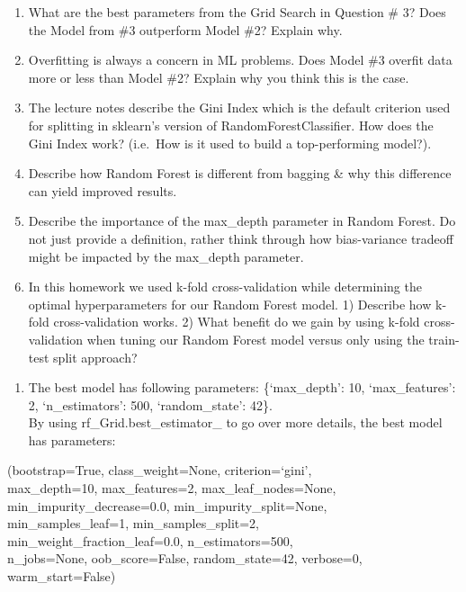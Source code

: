 \documentclass[11pt]{article}
\providecommand{\tightlist}{%
      \setlength{\itemsep}{0pt}\setlength{\parskip}{0pt}}
\begin{document}
    \begin{enumerate}
\def\labelenumi{\alph{enumi})}
\item
  What are the best parameters from the Grid Search in Question \# 3?
  Does the Model from \#3 outperform Model \#2? Explain why.
\item
  Overfitting is always a concern in ML problems. Does Model \#3 overfit
  data more or less than Model \#2? Explain why you think this is the
  case.
\item
  The lecture notes describe the Gini Index which is the default
  criterion used for splitting in sklearn's version of
  RandomForestClassifier. How does the Gini Index work? (i.e.~How is it
  used to build a top-performing model?).
\item
  Describe how Random Forest is different from bagging \& why this
  difference can yield improved results.
\item
  Describe the importance of the max\_depth parameter in Random Forest.
  Do not just provide a definition, rather think through how
  bias-variance tradeoff might be impacted by the max\_depth parameter.
\item
  In this homework we used k-fold cross-validation while determining the
  optimal hyperparameters for our Random Forest model. 1) Describe how
  k-fold cross-validation works. 2) What benefit do we gain by using
  k-fold cross-validation when tuning our Random Forest model versus
  only using the train-test split approach?
\end{enumerate}

    \begin{enumerate}
\def\labelenumi{\alph{enumi})}
\tightlist
\item
  The best model has following parameters: \{`max\_depth': 10,
  `max\_features': 2, `n\_estimators': 500, `random\_state': 42\}.\\
  By using rf\_Grid.best\_estimator\_ to go over more details, the best
  model has parameters:
\end{enumerate}

(bootstrap=True, class\_weight=None, criterion=`gini',\\
max\_depth=10, max\_features=2, max\_leaf\_nodes=None,\\
min\_impurity\_decrease=0.0, min\_impurity\_split=None,\\
min\_samples\_leaf=1, min\_samples\_split=2,\\
min\_weight\_fraction\_leaf=0.0, n\_estimators=500,\\
n\_jobs=None, oob\_score=False, random\_state=42, verbose=0,\\
warm\_start=False)
\end{document}
